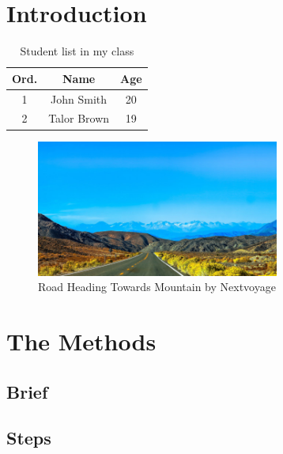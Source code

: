 \documentclass[12pt]{article}
\begin{document}
\tableofcontents
\listoftables
\listoffigures



\newpage
\section{Introduction}



\blindtext


\begin{table}[ht]
\centering
    \begin{tabular}{c | c | c}
        Ord. & Name & Age \\
        \hline
        1 & John Smith & 20 \\
        2 & Talor Brown & 19
    \end{tabular}
\caption{Student list in my class}
\label{tab:student_list_in_my_class}
\end{table}


\blindtext


\begin{figure}[ht]
    \centering
    \includegraphics[width=8cm]{img/nextvoyage-road-moutain.jpg}
    \caption{Road Heading Towards Mountain by Nextvoyage}
    \label{fig:purple flower}
\end{figure}


\Blindtext[2]



\section{The Methods}



\subsection{Brief}
\blindtext

\subsection{Steps}
\end{document}
